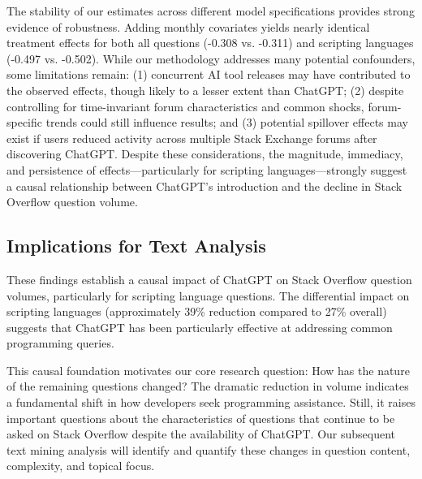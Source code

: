 The stability of our estimates across different model specifications provides strong evidence of robustness. Adding monthly covariates yields nearly identical treatment effects for both all questions (-0.308 vs. -0.311) and scripting languages (-0.497 vs. -0.502). While our methodology addresses many potential confounders, some limitations remain: (1) concurrent AI tool releases may have contributed to the observed effects, though likely to a lesser extent than ChatGPT; (2) despite controlling for time-invariant forum characteristics and common shocks, forum-specific trends could still influence results; and (3) potential spillover effects may exist if users reduced activity across multiple Stack Exchange forums after discovering ChatGPT. Despite these considerations, the magnitude, immediacy, and persistence of effects—particularly for scripting languages—strongly suggest a causal relationship between ChatGPT's introduction and the decline in Stack Overflow question volume.


\subsection{Implications for Text Analysis}

These findings establish a causal impact of ChatGPT on Stack Overflow question volumes, particularly for scripting language questions. The differential impact on scripting languages (approximately 39\% reduction compared to 27\% overall) suggests that ChatGPT has been particularly effective at addressing common programming queries.

This causal foundation motivates our core research question: How has the nature of the remaining questions changed? The dramatic reduction in volume indicates a fundamental shift in how developers seek programming assistance. Still, it raises important questions about the characteristics of questions that continue to be asked on Stack Overflow despite the availability of ChatGPT. Our subsequent text mining analysis will identify and quantify these changes in question content, complexity, and topical focus.